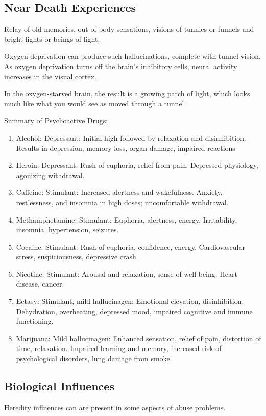 \documentclass[12pt]{article}
\begin{document}
\subsection*{Near Death Experiences}
Relay of old memories, out-of-body sensations, visions of tunnles or funnels and bright lights or beings of light. 

Oxygen deprivation can produce such hallucinations, complete with tunnel vision. As oxygen deprivation turns off the brain's inhibitory cells, neural activity increases in the visual cortex. 

In the oxygen-starved brain, the result is a growing patch of light, which looks much like what you would see as moved through a tunnel. 

Summary of Psychoactive Drugs:

\begin{enumerate}
\item Alcohol: Depressant: Initial high followed by relaxation and disinhibition. Results in depression, memory loss, organ damage, impaired reactions
\item Heroin: Depressant: Rush of euphoria, relief from pain. Depressed physiology, agonizing withdrawal. 
\item Caffeine: Stimulant: Increased alertness and wakefulness. Anxiety, restlessness, and insomnia in high doses; uncomfortable withdrawal.
\item Methamphetamine: Stimulant: Euphoria, alertness, energy. Irritability, insomnia, hypertension, seizures.
\item Cocaine: Stimulant: Rush of euphoria, confidence, energy. Cardiovascular stress, suspiciousness, depressive crash. 
\item Nicotine: Stimulant: Arousal and relaxation, sense of well-being. Heart disease, cancer. 
\item Ectasy: Stimulant, mild hallucinagen: Emotional elevation, disinhibition. Dehydration, overheating, depressed mood, impaired cognitive and immune functioning. 
\item Marijuana: Mild hallucinagen: Enhanced sensation, relief of pain, distortion of time, relaxation. Impaired learning and memory, increased risk of psychological disorders, lung damage from smoke.

\end{enumerate}

\subsection{Biological Influences}
Heredity influences can are present in some aspects of abuse problems. 
\end{document}
